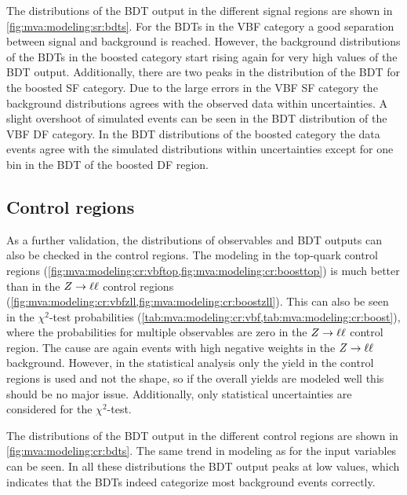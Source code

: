 The distributions of the BDT output in the different signal regions are shown in \cref{fig:mva:modeling:sr:bdts}.
For the BDTs in the VBF category a good separation between signal and background is reached.
However, the background distributions of the BDTs in the boosted category start rising again for very high values
of the BDT output.
Additionally, there are two peaks in the distribution of the BDT for the boosted SF category.
Due to the large errors in the VBF SF category the background distributions agrees with the observed data within uncertainties.
A slight overshoot of simulated events can be seen in the BDT distribution of the VBF DF category.
In the BDT distributions of the boosted category the data events agree with the simulated distributions within uncertainties except for
one bin in the BDT of the boosted DF region.

\subsection{Control regions}

As a further validation, the distributions of observables and BDT outputs can also be checked in the control regions.
The modeling in the top-quark control regions (\cref{fig:mva:modeling:cr:vbftop,fig:mva:modeling:cr:boosttop})
is much better than in the $Z \to \ell \ell$ control regions (\cref{fig:mva:modeling:cr:vbfzll,fig:mva:modeling:cr:boostzll}).
This can also be seen in the $\chi^2$-test probabilities (\cref{tab:mva:modeling:cr:vbf,tab:mva:modeling:cr:boost}), 
where the probabilities for multiple observables are zero in the $Z \to \ell \ell$ control region.
The cause are again events with high negative weights in the $Z \to \ell \ell$ background.
However, in the statistical analysis only the yield in the control regions is used and not the shape, so
if the overall yields are modeled well this should be no major issue.
Additionally, only statistical uncertainties are considered for the $\chi^2$-test.

The distributions of the BDT output in the different control regions are shown in \cref{fig:mva:modeling:cr:bdts}.
The same trend in modeling as for the input variables can be seen.
In all these distributions the BDT output peaks at low values, which indicates that the BDTs indeed categorize
most background events correctly.

\FloatBarrier{}

